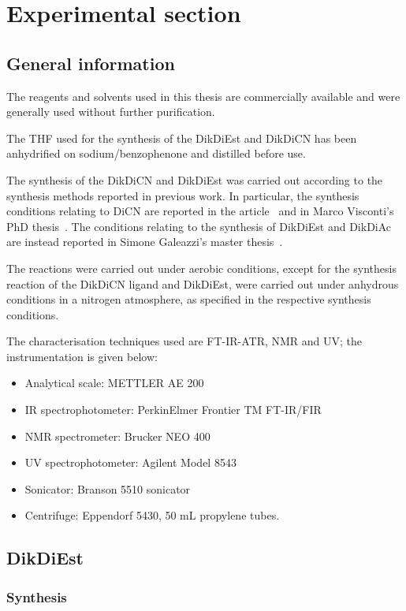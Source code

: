 \documentclass[../Master.tex]{subfiles}
\begin{document}
\chapter{Experimental section}\label{cha:experimental-section}

\section{General information}
The reagents and solvents used in this thesis are commercially available and were generally used without further purification.

The THF used for the synthesis of the DikDiEst and DikDiCN has been anhydrified on sodium/benzophenone and distilled before use.

The synthesis of the DikDiCN and DikDiEst was carried out according to the synthesis methods reported in previous work. In particular, the synthesis conditions relating to DiCN are reported in the article\ \cite{carlucci_heterometallic_2010} and in Marco Visconti's PhD thesis\ \cite{marco_visconti_new_2021}. The conditions relating to the synthesis of DikDiEst and DikDiAc are instead reported in Simone Galeazzi's master thesis\ \cite{simone_galeazzi_nuovi_2021}.

The reactions were carried out under aerobic conditions, except for the synthesis reaction of the
DikDiCN ligand and DikDiEst, were carried out under anhydrous conditions in a nitrogen atmosphere, as specified in the respective synthesis conditions.

The characterisation techniques used are FT-IR-ATR, NMR and UV; the instrumentation is given below:

\begin{itemize}
	\item Analytical scale: METTLER AE 200
	\item IR spectrophotometer: PerkinElmer Frontier TM FT-IR/FIR
	\item NMR spectrometer: Brucker NEO 400
	\item UV spectrophotometer: Agilent Model 8543
	\item Sonicator: Branson 5510 sonicator
	\item Centrifuge: Eppendorf 5430, 50 mL propylene tubes.
\end{itemize}
\section{DikDiEst}

\subsection{Synthesis}
\end{document}
